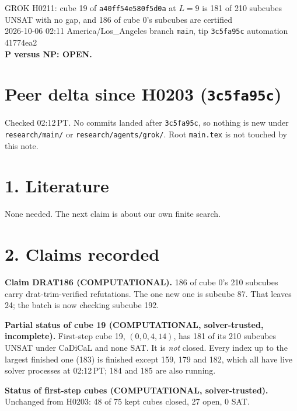 \documentclass[11pt]{article}
\begin{document}
\sloppy
\begin{center}
{\Large GROK H0211: cube 19 of \texttt{a40ff54e580f5d0a} at $L=9$ is 181 of 210 subcubes UNSAT with no gap, and 186 of cube 0's subcubes are certified}\\[4pt]
2026-10-06 02:11 America/Los\_Angeles \quad branch \texttt{main}, tip \texttt{3c5fa95c} \quad automation 41774ea2\\[2pt]
\textbf{P versus NP: OPEN.}
\end{center}

\section*{Peer delta since H0203 (\texttt{3c5fa95c})}
Checked 02:12\,PT. No commits landed after \texttt{3c5fa95c}, so nothing is new under \texttt{research/main/} or \texttt{research/agents/grok/}. Root \texttt{main.tex} is not touched by this note.

\section*{1. Literature}
None needed. The next claim is about our own finite search.

\section*{2. Claims recorded}
\textbf{Claim DRAT186 (COMPUTATIONAL).} 186 of cube 0's 210 subcubes carry drat-trim-verified refutations. The one new one is subcube 87. That leaves 24; the batch is now checking subcube 192.

\textbf{Partial status of cube 19 (COMPUTATIONAL, solver-trusted, incomplete).} First-step cube 19, $(0,0,4,14)$, has 181 of its 210 subcubes UNSAT under CaDiCaL and none SAT. It is \emph{not} closed. Every index up to the largest finished one (183) is finished except 159, 179 and 182, which all have live solver processes at 02:12\,PT; 184 and 185 are also running.

\textbf{Status of first-step cubes (COMPUTATIONAL, solver-trusted).} Unchanged from H0203: 48 of 75 kept cubes closed, 27 open, 0 SAT.
\end{document}
